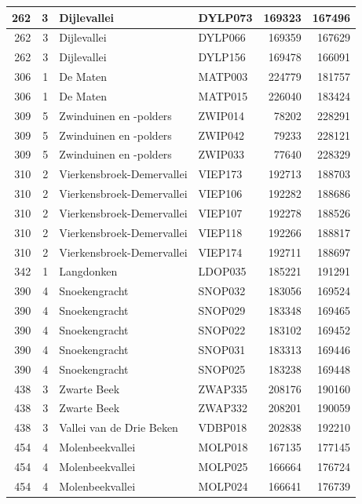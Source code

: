 \documentclass[11pt,]{book}
\begin{document}
\begin{table}
\begin{tabular}[t]{r|r|l|l|r|r}
\hline
262 & 3 & Dijlevallei & DYLP073 & 169323 & 167496\\
\hline
262 & 3 & Dijlevallei & DYLP066 & 169359 & 167629\\
\hline
262 & 3 & Dijlevallei & DYLP156 & 169478 & 166091\\
\hline
306 & 1 & De Maten & MATP003 & 224779 & 181757\\
\hline
306 & 1 & De Maten & MATP015 & 226040 & 183424\\
\hline
309 & 5 & Zwinduinen en -polders & ZWIP014 & 78202 & 228291\\
\hline
309 & 5 & Zwinduinen en -polders & ZWIP042 & 79233 & 228121\\
\hline
309 & 5 & Zwinduinen en -polders & ZWIP033 & 77640 & 228329\\
\hline
310 & 2 & Vierkensbroek-Demervallei & VIEP173 & 192713 & 188703\\
\hline
310 & 2 & Vierkensbroek-Demervallei & VIEP106 & 192282 & 188686\\
\hline
310 & 2 & Vierkensbroek-Demervallei & VIEP107 & 192278 & 188526\\
\hline
310 & 2 & Vierkensbroek-Demervallei & VIEP118 & 192266 & 188817\\
\hline
310 & 2 & Vierkensbroek-Demervallei & VIEP174 & 192711 & 188697\\
\hline
342 & 1 & Langdonken & LDOP035 & 185221 & 191291\\
\hline
390 & 4 & Snoekengracht & SNOP032 & 183056 & 169524\\
\hline
390 & 4 & Snoekengracht & SNOP029 & 183348 & 169465\\
\hline
390 & 4 & Snoekengracht & SNOP022 & 183102 & 169452\\
\hline
390 & 4 & Snoekengracht & SNOP031 & 183313 & 169446\\
\hline
390 & 4 & Snoekengracht & SNOP025 & 183238 & 169448\\
\hline
438 & 3 & Zwarte Beek & ZWAP335 & 208176 & 190160\\
\hline
438 & 3 & Zwarte Beek & ZWAP332 & 208201 & 190059\\
\hline
438 & 3 & Vallei van de Drie Beken & VDBP018 & 202838 & 192210\\
\hline
454 & 4 & Molenbeekvallei & MOLP018 & 167135 & 177145\\
\hline
454 & 4 & Molenbeekvallei & MOLP025 & 166664 & 176724\\
\hline
454 & 4 & Molenbeekvallei & MOLP024 & 166641 & 176739\\

\end{tabular}
\end{table}
\end{document}
